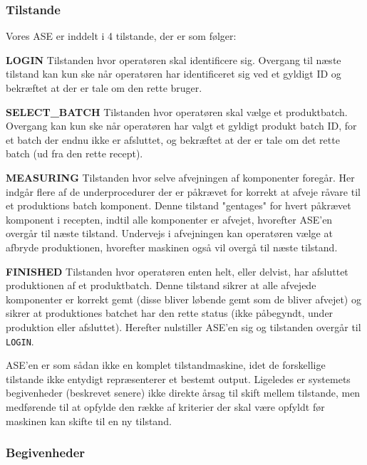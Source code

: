 \documentclass[a4paper]{article}
\newenvironment{my_itemize}
{\begin{itemize}
  \setlength{\itemsep}{1pt}
  \setlength{\parskip}{0pt}
  \setlength{\parsep}{0pt}}
{\end{itemize}}
\begin{document}
\subsubsection{Tilstande} %

Vores ASE er inddelt i 4 tilstande, der er som følger:
\begin{my_itemize}
  \item \textbf{LOGIN} Tilstanden hvor operatøren skal identificere sig. Overgang til næste tilstand kan kun ske når operatøren har identificeret sig ved et gyldigt ID og bekræftet at der er tale om den rette bruger.
  \item \textbf{SELECT\_BATCH} Tilstanden hvor operatøren skal vælge et produktbatch. Overgang kan kun ske når operatøren har valgt et gyldigt produkt batch ID, for et batch der endnu ikke er afsluttet, og bekræftet at der er tale om det rette batch (ud fra den rette recept).
  \item \textbf{MEASURING} Tilstanden hvor selve afvejningen af komponenter foregår. Her indgår flere af de underprocedurer der er påkrævet for korrekt at afveje råvare til et produktions batch komponent. Denne tilstand "gentages" for hvert påkrævet komponent i recepten, indtil alle komponenter er afvejet, hvorefter ASE'en overgår til næste tilstand. Undervejs i afvejningen kan operatøren vælge at afbryde produktionen, hvorefter maskinen også vil overgå til næste tilstand.
  \item \textbf{FINISHED} Tilstanden hvor operatøren enten helt, eller delvist, har afsluttet produktionen af et produktbatch. Denne tilstand sikrer at alle afvejede komponenter er korrekt gemt (disse bliver løbende gemt som de bliver afvejet) og sikrer at produktiones batchet har den rette status (ikke påbegyndt, under produktion eller afsluttet). Herefter nulstiller ASE'en sig og tilstanden overgår til \texttt{LOGIN}.
\end{my_itemize}

ASE'en er som sådan ikke en komplet tilstandmaskine, idet de forskellige tilstande ikke entydigt repræsenterer et bestemt output. Ligeledes er systemets begivenheder (beskrevet senere) ikke direkte årsag til skift mellem tilstande, men medførende til at opfylde den række af kriterier der skal være opfyldt før maskinen kan skifte til en ny tilstand.


\subsubsection{Begivenheder} %
\end{document}
